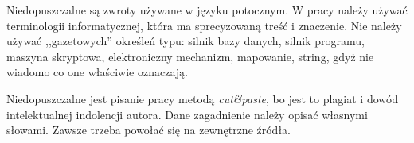 Niedopuszczalne są zwroty używane w języku potocznym. W pracy należy używać terminologii informatycznej, która ma
sprecyzowaną treść i znaczenie. Nie należy używać ,,gazetowych'' określeń typu:
silnik bazy danych, silnik programu, maszyna skryptowa, elektroniczny mechanizm, mapowanie, string, gdyż nie wiadomo
co one właściwie oznaczają.

Niedopuszczalne jest pisanie pracy metodą \emph{cut\&paste}, bo jest to plagiat i dowód intelektualnej indolencji autora.
Dane zagadnienie należy opisać własnymi słowami. Zawsze trzeba powołać się na zewnętrzne źródła. 

